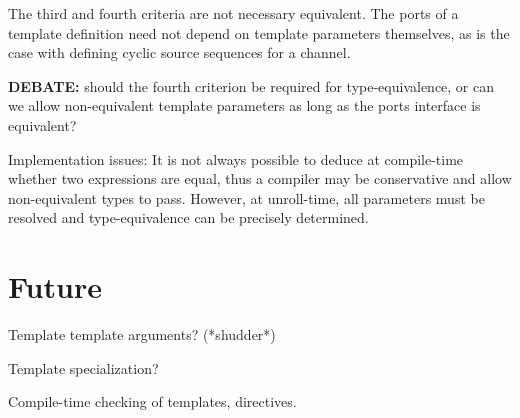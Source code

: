 The third and fourth criteria are not necessary equivalent.  
The ports of a template definition need not depend on template
parameters themselves, as is the case with defining 
cyclic source sequences for a channel.  

\textbf{DEBATE:} should the fourth criterion be required for type-equivalence, 
or can we allow non-equivalent template parameters as long as the
ports interface is equivalent?  

Implementation issues:
It is not always possible to deduce at compile-time whether
two expressions are equal, thus a compiler may be conservative
and allow non-equivalent types to pass.  
However, at unroll-time, all parameters must be resolved
and type-equivalence can be precisely determined.  

\section{Future}
\label{sec:templates:future}

Template template arguments?  (*shudder*)

Template specialization?

Compile-time checking of templates, directives.  

